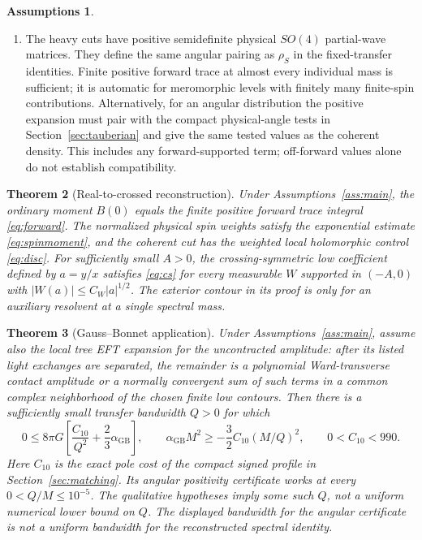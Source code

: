 \documentclass[11pt,a4paper]{article}
\newtheorem{theorem}{Theorem}[section]
\theoremstyle{definition}
\newtheorem{assumption}[theorem]{Assumptions}
\theoremstyle{remark}
\newcommand{\GB}{\alpha_{\mathrm{GB}}}
\begin{document}
\begin{assumption}
\begin{enumerate}
\item The heavy cuts have positive semidefinite physical $SO(4)$ partial-wave matrices. They define the same angular pairing as $\rho_S$ in the fixed-transfer identities. Finite positive forward trace at almost every individual mass is sufficient; it is automatic for meromorphic levels with finitely many finite-spin contributions. Alternatively, for an angular distribution the positive expansion must pair with the compact physical-angle tests in Section~\ref{sec:tauberian} and give the same tested values as the coherent density. This includes any forward-supported term; off-forward values alone do not establish compatibility.
\end{enumerate}
\end{assumption}

\begin{theorem}[Real-to-crossed reconstruction]\label{th:reconstruct}
Under Assumptions~\ref{ass:main}, the ordinary moment \(B(0)\) equals the finite positive forward trace integral \eqref{eq:forward}. The normalized physical spin weights satisfy the exponential estimate \eqref{eq:spinmoment}, and the coherent cut has the weighted local holomorphic control \eqref{eq:disc}. For sufficiently small \(A>0\), the crossing-symmetric low coefficient defined by \(a=y/x\) satisfies \eqref{eq:cs} for every measurable \(W\) supported in \((-A,0)\) with \(|W(a)|\leq C_W|a|^{1/2}\). The exterior contour in its proof is only for an auxiliary resolvent at a single spectral mass.
\end{theorem}

\begin{theorem}[Gauss--Bonnet application]\label{th:main}
Under Assumptions~\ref{ass:main}, assume also the local tree EFT expansion for the uncontracted amplitude: after its listed light exchanges are separated, the remainder is a polynomial Ward-transverse contact amplitude or a normally convergent sum of such terms in a common complex neighborhood of the chosen finite low contours. Then there is a sufficiently small transfer bandwidth $Q>0$ for which
\begin{equation}\label{eq:bound}
 0\le 8\pi G\left[\frac{C_{10}}{Q^2}+\frac23\GB\right],
 \qquad
 \GB M^2\ge-\frac{3}{2}C_{10}(M/Q)^2,
 \qquad 0<C_{10}<990 .
\end{equation}
Here $C_{10}$ is the exact pole cost of the compact signed profile in Section~\ref{sec:matching}. Its angular positivity certificate works at every $0<Q/M\le10^{-5}$. The qualitative hypotheses imply some such $Q$, not a uniform numerical lower bound on $Q$. The displayed bandwidth for the angular certificate is not a uniform bandwidth for the reconstructed spectral identity.
\end{theorem}
\end{document}
